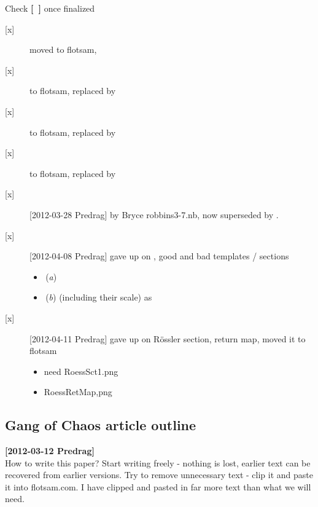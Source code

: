 Check {\bf [~]} once finalized
\begin{description}

\item[{[x]}] moved  to flotsam,
\item[{[x]}]  to flotsam, replaced by 
\item[{[x]}]  to flotsam, replaced by 
\item[{[x]}]  to flotsam, replaced by 

\item[{[x]}] [2012-03-28 Predrag]
         by Bryce robbins3-7.nb, now superseded by
        .

\item[{[x]}] [2012-04-08 Predrag] gave up on ,
    good and bad templates / sections
    \begin{itemize}
        \item[{[ ]}] [2012-04-07 Predrag] \,({\it a})
        \item[{[ ]}] [2012-04-07 Predrag] \,({\it b})
            (including their scale) as
    \end{itemize}

\item[{[x]}] [2012-04-11 Predrag]  gave up on 
    R\"ossler section, return map, moved it to flotsam
    \begin{itemize}
        \item[{[ ]}] [2012-04-07 Predrag] need {RoessSct1}.png
        \item[{[ ]}] [2012-04-07 Keith] {RoessRetMap},png
    \end{itemize}

\end{description}
\newpage

\subsection{Gang of Chaos article outline}
\label{chap:outline}

\noindent
{\bf [2012-03-12 Predrag]}
\\
How to write this paper? Start writing freely - nothing is lost, earlier text can be recovered
from earlier versions. Try to remove unnecessary text - clip  it and paste it into flotsam.com.
I have clipped and pasted in far more text than what we will need.

